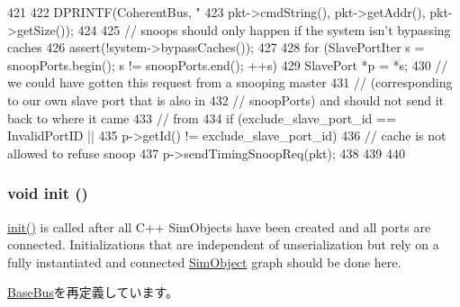 \begin{DoxyCode}
421 {
422     DPRINTF(CoherentBus, "%
423             pkt->cmdString(), pkt->getAddr(), pkt->getSize());
424 
425     // snoops should only happen if the system isn't bypassing caches
426     assert(!system->bypassCaches());
427 
428     for (SlavePortIter s = snoopPorts.begin(); s != snoopPorts.end(); ++s) {
429         SlavePort *p = *s;
430         // we could have gotten this request from a snooping master
431         // (corresponding to our own slave port that is also in
432         // snoopPorts) and should not send it back to where it came
433         // from
434         if (exclude_slave_port_id == InvalidPortID ||
435             p->getId() != exclude_slave_port_id) {
436             // cache is not allowed to refuse snoop
437             p->sendTimingSnoopReq(pkt);
438         }
439     }
440 }
\end{DoxyCode}
\hypertarget{classCoherentBus_a02fd73d861ef2e4aabb38c0c9ff82947}{
\subsubsection[{init}]{\setlength{\rightskip}{0pt plus 5cm}void init ()}}
\label{classCoherentBus_a02fd73d861ef2e4aabb38c0c9ff82947}
\hyperlink{classCoherentBus_a02fd73d861ef2e4aabb38c0c9ff82947}{init()} is called after all C++ SimObjects have been created and all ports are connected. Initializations that are independent of unserialization but rely on a fully instantiated and connected \hyperlink{classSimObject}{SimObject} graph should be done here. 

\hyperlink{classBaseBus_a02fd73d861ef2e4aabb38c0c9ff82947}{BaseBus}を再定義しています。


